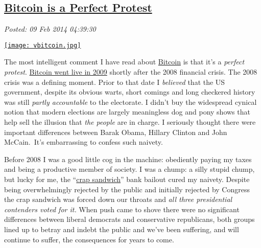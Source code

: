 %

\subsection*{\href{http://bakerjd99.wordpress.com/2014/02/08/bitcoin-is-a-perfect-protest/}{Bitcoin is a Perfect Protest}}


\noindent\emph{Posted: 09 Feb 2014 04:39:30}
\vspace{6pt}


\captionsetup[floatingfigure]{labelformat=empty}
\begin{floatingfigure}[l]{0.24\textwidth}
\centering
\href{http://bakerjd99.wordpress.com/2014/02/08/bitcoin-is-a-perfect-protest/vbitcoin/}{\texttt{[image: vbitcoin.jpg]}}
\label{fig:4521X0}
\end{floatingfigure} The
most intelligent comment I have read about
\href{https://bitcoin.org/en/}{Bitcoin} is that it's a \emph{perfect
protest}. \href{https://en.bitcoin.it/wiki/Genesis_block}{Bitcoin went
live in 2009} shortly after the 2008 financial crisis. The 2008 crisis
was a defining moment. Prior to that date I \emph{believed} that the US
government, despite its obvious warts, short comings and long checkered
history was still \emph{partly accountable} to the electorate. I didn't
buy the widespread cynical notion that modern elections are largely
meaningless dog and pony shows that help sell the illusion that
\emph{the people} are in charge. I seriously thought there were
important differences between Barak Obama, Hillary Clinton and John
McCain.~It's embarrassing to confess such naivety.

Before 2008 I was a good little cog in the machine: obediently paying my
taxes and being a productive member of society. I was a chump: a silly
stupid chump, but lucky for me, the
``\href{http://www.cbsnews.com/news/boehner-calls-bill-a-crap-sandwich-but-hell-vote-for-it/}{crap
sandwich}'' bank bailout cured my naivety. Despite being overwhelmingly
rejected by the public and initially rejected by Congress the crap
sandwich was forced down our throats and \emph{all three presidential
contenders voted for it.}  When push came to shove there were no
significant differences between liberal democrats and conservative
republicans, both groups lined up to betray and indebt the public and
we've been suffering, and will continue to suffer, the consequences for
years to come.

